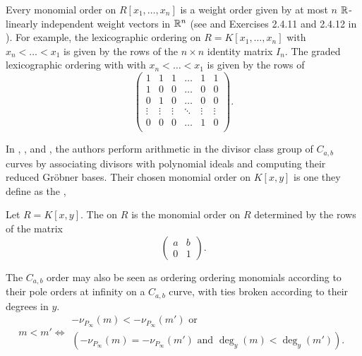Every monomial order on $R[x_1, \ldots, x_n]$ is a weight order given by at most $n$ $\mathbb{R}$-linearly independent weight vectors in $\mathbb{R}^n$
(see \cite{robbiano86} and Exercises 2.4.11 and 2.4.12 in \cite{cox07}).
For example, the lexicographic ordering on $R = K[x_1, \ldots, x_n]$ with $x_n < \dots < x_1$ is given by the rows
of the $n \times n$ identity matrix $I_n$.
The graded lexicographic ordering with with $x_n < \dots < x_1$ is given by the rows of
  \[ \begin{pmatrix}
       1 & 1 & 1 & \dots & 1 & 1 \\
       1 & 0 & 0 & \dots & 0 & 0 \\
       0 & 1 & 0 & \dots & 0 & 0 \\
       \vdots & \vdots & \vdots & \ddots & \vdots & \vdots \\
       0 & 0 & 0 & \dots & 1 & 0 \\
     \end{pmatrix}. \]

In \cite{arita99}, \cite{arita03-1}, and \cite{harasawa00}, the authors perform arithmetic in the divisor class group of $C_{a,b}$ curves
by associating divisors with polynomial ideals and computing their reduced Gr\"obner bases.
Their chosen monomial order on $K[x,y]$ is one they define as the ,
\begin{definition}
  \label{def_cab_order}
  Let $R = K[x,y]$.
  The  on $R$ is the monomial order on $R$ determined by the rows of the matrix
  \[ \begin{pmatrix} a & b \\ 0 & 1 \end{pmatrix}. \]
\end{definition}
The $C_{a,b}$ order may also be seen as ordering ordering monomials
according to their pole orders at infinity on a $C_{a,b}$ curve,
with ties broken according to their degrees in $y$.
\[ m < m' \iff
  \begin{array}{l}
    -\nu_{P_\infty}(m) < -\nu_{P_\infty}(m') \text{ or} \\
    (-\nu_{P_\infty}(m) = -\nu_{P_\infty}(m') \text{ and } \deg_y(m) < \deg_y(m')).
  \end{array}
\]

